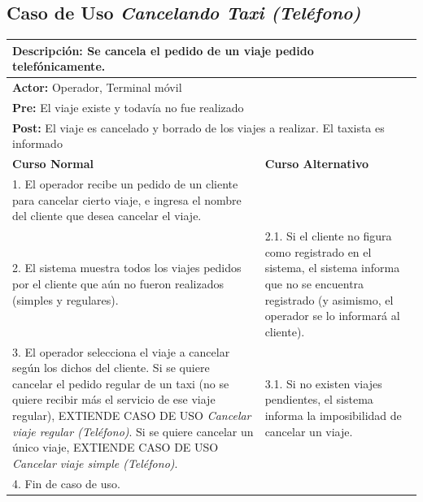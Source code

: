 \documentclass[a4paper]{article}
\begin{document}
\subsection{Caso de Uso \textit{Cancelando Taxi (Tel\'efono)}}
\begin{center}
\begin{tabular}{|p{10cm} | p{6cm}|}
\hline
\multicolumn{2}{|p{15cm}|}{\textbf{Descripci\'on:} Se cancela el pedido de un viaje pedido telef\'onicamente.} \\
\hline
\multicolumn{2}{|p{15cm}|}{\textbf{Actor:} Operador, Terminal m\'ovil} \\
\hline
\multicolumn{2}{|p{15cm}|}{\textbf{Pre:} El viaje existe y todav\'ia no fue realizado} \\
\hline
\multicolumn{2}{|p{15cm}|}{\textbf{Post:} El viaje es cancelado y borrado de los viajes a realizar. El taxista es informado}\\
\hline
\textbf{Curso Normal}  & \textbf{Curso Alternativo} \\ \hline
1. El operador recibe un pedido de un cliente para cancelar cierto viaje, e ingresa el nombre del cliente que desea cancelar el viaje. & \\ \hline
2. El sistema muestra todos los viajes pedidos por el cliente que a\'un no fueron realizados (simples y regulares). & 2.1. Si el cliente no figura como registrado en el sistema, el sistema informa que no se encuentra registrado (y asimismo, el operador se lo informar\'a al cliente). \\ \hline
3. El operador selecciona el viaje a cancelar seg\'un los dichos del cliente. Si se quiere cancelar el pedido regular de un taxi (no se quiere recibir m\'as el servicio de ese viaje regular), EXTIENDE CASO DE USO \textit{Cancelar viaje regular (Tel\'efono)}. \newline Si se quiere cancelar un \'unico viaje, EXTIENDE CASO DE USO \textit{Cancelar viaje simple (Tel\'efono)}. & 3.1. Si no existen viajes pendientes, el sistema informa la imposibilidad de cancelar un viaje. \\ \hline %
4. Fin de caso de uso. & \\ \hline
\end{tabular}
\end{center}
\end{document}
